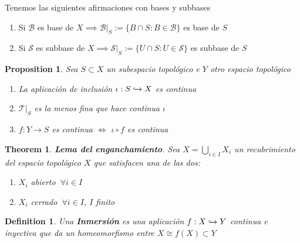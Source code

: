 \documentclass[leqno]{article}
\newtheorem*{definition}{Definition}
\newtheorem*{theorem}{Theorem}
\newtheorem*{proposition}{Proposition}
\begin{document}
Tenemos las siguientes afirmaciones con bases y subbases
\begin{enumerate}[topsep=-6pt, itemsep=0pt]
  \item Si $\mathcal{B} $ es base de $X \implies \mathcal{B}|_S:=\{B\cap S:B\in \mathcal{B}\}$ es base de $S$ 
  \item Si $\mathcal{S} $ es subbase de $X \implies \mathcal{S}|_S:=\{U\cap S:U\in \mathcal{S}\}$ es subbase de $S$ 
\end{enumerate}

\begin{proposition}
Sea $S\subset X$ un subespacio topológico e $Y$ otro espacio topológico
 \begin{enumerate}[topsep=-6pt, itemsep=0pt]
  \item La aplicación de inclusión $\iota: S \xhookrightarrow{} X$ es continua
  \item  $\mathcal{T}|_S$ es la menos fina que hace continua $\iota$
  \item $f:Y\to  S$ es continua $\iff$ $\iota\circ f$ es continua
\end{enumerate}
\end{proposition}

\begin{theorem}
\textbf{Lema del enganchamiento}. Sea $X=\bigcup_{i\in I} X_i$ un recubrimiento del espacio topológico $X$ que satisfacen una de las dos:
\begin{enumerate}[topsep=-6pt, itemsep=0pt]
  \item $X_i$ abierto  $\ \forall i\in I$
  \item $X_i$ cerrado  $\ \forall i\in I$, $I$ finito 
\end{enumerate}
\end{theorem}

\begin{definition}
Una \textbf{Inmersión} es una aplicación $f: X \xhookrightarrow{} Y$ continua e inyectiva que da un homeomorfismo entre $X \cong f(X)\subset Y$
\end{definition}
\end{document}
